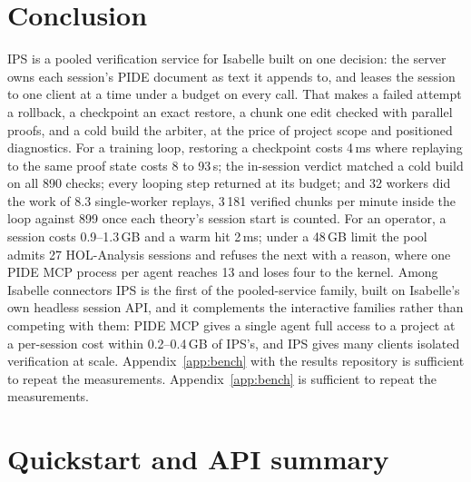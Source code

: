 \documentclass[11pt]{article}
\begin{document}
\section{Conclusion}
\label{sec:conclusion}

IPS is a pooled verification service for Isabelle built on one decision:
the server owns each session's PIDE document as text it appends to, and
leases the session to one client at a time under a budget on every call.
That makes a failed attempt a rollback, a checkpoint an exact restore, a
chunk one edit checked with parallel proofs, and a cold build the
arbiter, at the price of project scope and positioned diagnostics. For a
training loop, restoring a checkpoint costs 4\,ms where replaying to the
same proof state costs 8 to 93\,s; the in-session verdict matched a cold
build on all 890 checks; every looping step returned at its budget; and
32 workers did the work of 8.3 single-worker replays, 3\,181 verified
chunks per minute inside the loop against 899 once each theory's session
start is counted. For an operator, a session costs 0.9--1.3\,GB and a
warm hit 2\,ms; under a 48\,GB limit the pool admits 27 HOL-Analysis
sessions and refuses the next with a reason, where one PIDE MCP process
per agent reaches 13 and loses four to the kernel. Among Isabelle
connectors IPS is the first of the pooled-service family, built on
Isabelle's own headless session API, and it complements the interactive
families rather than competing with them: PIDE MCP gives a single agent
full access to a project at a per-session cost within 0.2--0.4\,GB of
IPS's, and IPS gives many clients isolated verification at scale.
Appendix~\ref{app:bench} with the results repository is sufficient to
repeat the measurements.
Appendix~\ref{app:bench} is sufficient to repeat the measurements.




\appendix

\section{Quickstart and API summary}
\label{app:quickstart}
\end{document}
